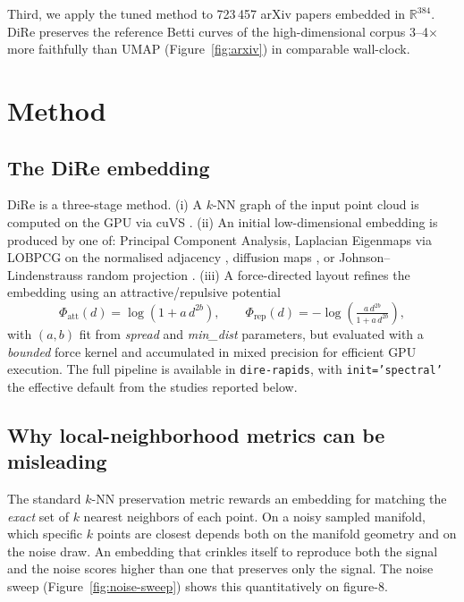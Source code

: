 \documentclass[9pt,twocolumn,twoside]{pnas-new}
\providecommand{\Endparasplit}{}
\begin{document}
Third, we apply the tuned method to 723\,457 arXiv papers embedded in
$\mathbb{R}^{384}$. DiRe preserves the reference Betti curves of the
high-dimensional corpus 3--4$\times$ more faithfully than UMAP
(Figure~\ref{fig:arxiv}) in comparable wall-clock.

\Endparasplit

\section*{Method}
\label{sec:method}

\subsection*{The DiRe embedding}
DiRe \citep{dire-joss,dire-rapids} is a three-stage method. (i) A $k$-NN
graph of the input point cloud is computed on the GPU via cuVS
\citep{cuvs}. (ii) An initial low-dimensional embedding is produced by
one of: Principal Component Analysis, Laplacian Eigenmaps via LOBPCG on
the normalised adjacency \citep{lobpcg}, diffusion maps
\citep{coifman-diffusion-maps}, or Johnson--Lindenstrauss random
projection \citep{jl}. (iii) A force-directed layout refines the
embedding using an attractive/repulsive potential
\[
\Phi_{\text{att}}(d) = \log(1 + a\, d^{2b}),
\qquad
\Phi_{\text{rep}}(d) = -\log\!\left( \tfrac{a\, d^{2b}}{1 + a\, d^{2b}} \right),
\]
with $(a, b)$ fit from \emph{spread} and \emph{min\_dist} parameters, but
evaluated with a \emph{bounded} force kernel and accumulated in mixed
precision for efficient GPU execution. The full pipeline is available in
\texttt{dire-rapids}, with \texttt{init='spectral'} the effective default
from the studies reported below.

\subsection*{Why local-neighborhood metrics can be misleading}
The standard $k$-NN preservation metric rewards an embedding for matching
the \emph{exact} set of $k$ nearest neighbors of each point. On a noisy
sampled manifold, which specific $k$ points are closest depends both on
the manifold geometry and on the noise draw. An embedding that crinkles
itself to reproduce both the signal and the noise scores higher than one
that preserves only the signal. The noise sweep
(Figure~\ref{fig:noise-sweep}) shows this quantitatively on figure-8.
\end{document}
